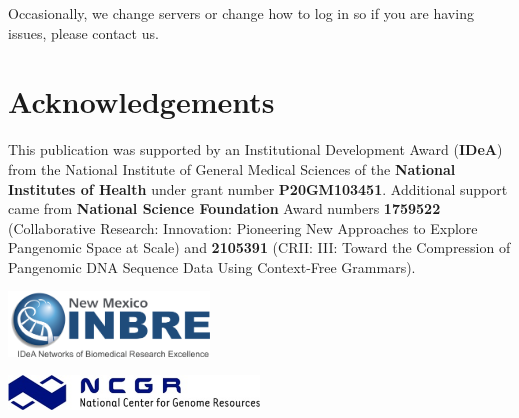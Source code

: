 \documentclass[
]{book}
\begin{document}
Occasionally, we change servers or change how to log in so if you are having issues, please contact us.

\hypertarget{acknowledgements}{%
\chapter*{Acknowledgements}\label{acknowledgements}}

This publication was supported by an Institutional Development Award (\textbf{IDeA}) from the National Institute of General Medical Sciences of the \textbf{National Institutes of Health} under grant number \textbf{P20GM103451}. Additional support came from \textbf{National Science Foundation} Award numbers \textbf{1759522} (Collaborative Research: Innovation: Pioneering New Approaches to Explore Pangenomic Space at Scale) and \textbf{2105391} (CRII: III: Toward the Compression of Pangenomic DNA Sequence Data Using Context-Free Grammars).

\includegraphics[width=0.4\textwidth,height=\textheight]{./Figures/INBRE_Logo_Grad_transparent-2019.png}

\includegraphics[width=0.5\textwidth,height=\textheight]{./Figures/ncgr.png}

  
\end{document}
